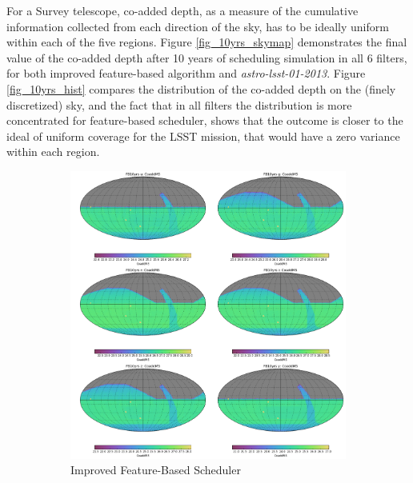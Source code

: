 \documentclass[12pt,aas_macros]{article}
\theoremstyle{definition}
\begin{document}
For a Survey telescope, co-added depth, as a measure of the cumulative information collected from each direction of the sky, has to be ideally uniform within each of the five regions. Figure \ref{fig_10yrs_skymap} demonstrates the final value of the co-added depth after 10 years of scheduling simulation in all 6 filters, for both improved feature-based algorithm and \textit{astro-lsst-01-2013}. Figure \ref{fig_10yrs_hist} compares the distribution of the co-added depth on the (finely discretized) sky, and the fact that in all filters the distribution is more concentrated for feature-based scheduler, shows that the outcome is closer to the ideal of uniform coverage for the LSST mission, that would have a zero variance within each region.



\begin{figure}[h!]
\begin{subfigure}{.5\textwidth}
  \centering
  \includegraphics[width=.9\linewidth]{FB10yrs_skymap.png}
  \caption{Improved Feature-Based Scheduler}
  \label{fig:sfig1}
\end{subfigure}
\begin{subfigure}{.5\textwidth}
  \centering

\end{subfigure}
\end{figure}
\end{document}
